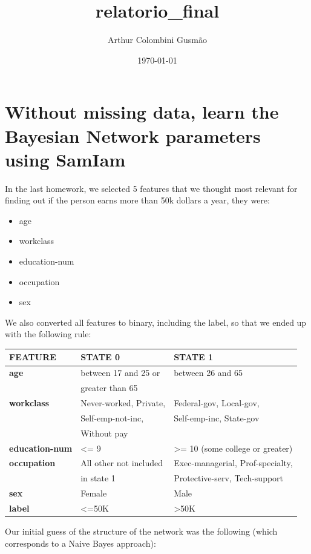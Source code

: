 \documentclass{article}
\author{Arthur Colombini Gusmão}
\date{\today}
\title{relatorio\_final}
\begin{document}
\maketitle

\section{Without missing data, learn the Bayesian Network parameters using SamIam}
\label{sec-1}
In the last homework, we selected 5 features that we thought most relevant for finding out if
the person earns more than 50k dollars a year, they were:
\begin{itemize}
\item age
\item workclass
\item education-num
\item occupation
\item sex
\end{itemize}

We also converted all features to binary, including the label, so that we ended up with the
following rule:
\begin{center}
\begin{tabular}{lll}
\hline
\textbf{FEATURE} & \textbf{STATE 0} & \textbf{STATE 1}\\
\hline
\textbf{age} & between 17 and 25 or & between 26 and 65\\
 & greater than 65 & \\
\hline
\textbf{workclass} & Never-worked, Private, & Federal-gov, Local-gov,\\
 & Self-emp-not-inc, & Self-emp-inc, State-gov\\
 & Without pay & \\
\hline
\textbf{education-num} & <= 9 & >= 10 (some college or greater)\\
\hline
\textbf{occupation} & All other not included & Exec-managerial, Prof-specialty,\\
 & in state 1 & Protective-serv, Tech-support\\
\hline
\textbf{sex} & Female & Male\\
\hline
\textbf{label} & <=50K & >50K\\
\hline
\end{tabular}
\end{center}

Our initial guess of the structure of the network was the following (which corresponds to a
Naive Bayes approach):
\end{document}
